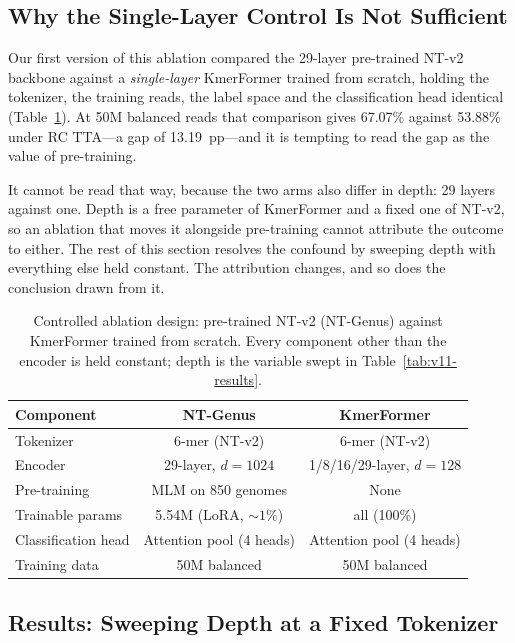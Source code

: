 \subsection{Why the Single-Layer Control Is Not Sufficient}

Our first version of this ablation compared the 29-layer pre-trained NT-v2 backbone against a \emph{single-layer} KmerFormer trained from scratch, holding the tokenizer, the training reads, the label space and the classification head identical (Table~\ref{tab:shallow-design}). At 50M balanced reads that comparison gives 67.07\% against 53.88\% under RC TTA---a gap of 13.19~pp---and it is tempting to read the gap as the value of pre-training.

It cannot be read that way, because the two arms also differ in depth: 29 layers against one. Depth is a free parameter of KmerFormer and a fixed one of NT-v2, so an ablation that moves it alongside pre-training cannot attribute the outcome to either. The rest of this section resolves the confound by sweeping depth with everything else held constant. The attribution changes, and so does the conclusion drawn from it.

\begin{table}[htbp]
    \centering
    \caption{Controlled ablation design: pre-trained NT-v2 (NT-Genus) against KmerFormer trained from scratch. Every component other than the encoder is held constant; depth is the variable swept in Table~\ref{tab:v11-results}.}
    \label{tab:shallow-design}
    \begin{tabular}{lcc}
        \toprule
        \textbf{Component} & \textbf{NT-Genus} & \textbf{KmerFormer} \\
        \midrule
        Tokenizer & 6-mer (NT-v2) & 6-mer (NT-v2) \\
        Encoder & 29-layer, $d{=}1024$ & 1/8/16/29-layer, $d{=}128$ \\
        Pre-training & MLM on 850 genomes & None \\
        Trainable params & 5.54M (LoRA, ${\sim}1\%$) & all (100\%) \\
        Classification head & Attention pool (4 heads) & Attention pool (4 heads) \\
        Training data & 50M balanced & 50M balanced \\
        \bottomrule
    \end{tabular}
\end{table}

\subsection{Results: Sweeping Depth at a Fixed Tokenizer}

